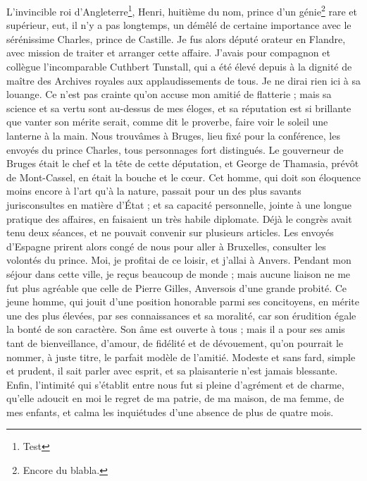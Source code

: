 \documentclass[12pt,a4paper]{book}
\begin{document}
\begin{pages}
    \begin{Rightside} 
        \beginnumbering
        \pstart
        L'invincible roi d'Angleterre\footnote{Test}, Henri, huitième du nom, prince d'un génie\footnote{Encore du blabla.} rare et supérieur, eut, il n'y a pas longtemps, un démêlé de certaine importance avec le sérénissime Charles, prince de Castille. Je fus alors député orateur en Flandre, avec mission de traiter et arranger cette affaire. J'avais pour compagnon et collègue l'incomparable Cuthbert Tunstall, qui a été élevé depuis à la dignité de maître des Archives royales aux applaudissements de tous. Je ne dirai rien ici à sa louange. Ce n'est pas crainte qu'on accuse mon amitié de flatterie ; mais sa science et sa vertu sont au-dessus de mes éloges, et sa réputation est si brillante que vanter son mérite serait, comme dit le proverbe, faire voir le soleil une lanterne à la main.
		\pend
		\pstart
        Nous trouvâmes à Bruges, lieu fixé pour la conférence, les envoyés du prince Charles, tous personnages fort distingués. Le gouverneur de Bruges était le chef et la tête de cette députation, et George de Thamasia, prévôt de Mont-Cassel, en était la bouche et le cœur. Cet homme, qui doit son éloquence moins encore à l'art qu'à la nature, passait pour un des plus savants jurisconsultes en matière d'État ; et sa capacité personnelle, jointe à une longue pratique des affaires, en faisaient un très habile diplomate. Déjà le congrès avait tenu deux séances, et ne pouvait convenir sur plusieurs articles. Les envoyés d'Espagne prirent alors congé de nous pour aller à Bruxelles, consulter les volontés du prince. 
        \pend
		\pstart
        Moi, je profitai de ce loisir, et j'allai à Anvers. Pendant mon séjour dans cette ville, je reçus beaucoup de monde ; mais aucune liaison ne me fut plus agréable que celle de Pierre Gilles, Anversois d'une grande probité. Ce jeune homme, qui jouit d'une position honorable parmi ses concitoyens, en mérite une des plus élevées, par ses connaissances et sa moralité, car son érudition égale la bonté de son caractère. Son âme est ouverte à tous ; mais il a pour ses amis tant de bienveillance, d'amour, de fidélité et de dévouement, qu'on pourrait le nommer, à juste titre, le parfait modèle de l'amitié. Modeste et sans fard, simple et prudent, il sait parler avec esprit, et sa plaisanterie n'est jamais blessante. Enfin, l'intimité qui s'établit entre nous fut si pleine d'agrément et de charme, qu'elle adoucit en moi le regret de ma patrie, de ma maison, de ma femme, de mes enfants, et calma les inquiétudes d'une absence de plus de quatre mois. 

\end{Rightside}
\end{pages}
\end{document}
